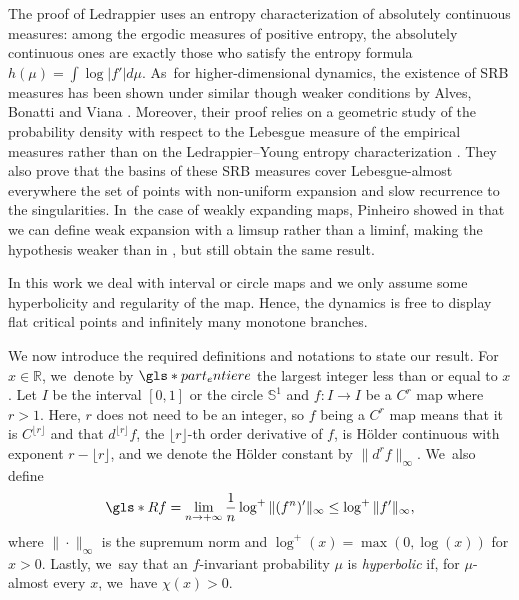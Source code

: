 \documentclass[JEP,XML,SOM,Unicode,NoFloatCountersInSection,published]{cedram}
\let\rC C
\theoremstyle{definition}
\newcommand{\bbR}{{\mathbb{R}}}
\newcommand{\bbS}{{\mathbb{S}}}
\begin{document}
The proof of Ledrappier uses an entropy characterization of absolutely continuous measures: among the ergodic measures of positive entropy, the absolutely continuous ones are exactly those who satisfy the entropy formula $h(\mu) = \int \log |f'| d \mu$. As~for higher-dimensional dynamics, the existence of SRB measures has been shown under similar though weaker conditions by Alves, Bonatti and Viana \cite{Alves2000}.
Moreover, their proof relies on a geometric study of the probability density with respect to the Lebesgue measure of the empirical measures rather than on the Ledrappier--Young entropy characterization \cite{Ledrappier_Young_1985a,Ledrappier_Young_1985b}.
They also prove that the basins of these SRB measures cover Lebesgue-almost everywhere the set of points with non-uniform expansion and slow recurrence to the singularities. In~the case of weakly expanding maps, Pinheiro showed in \cite{Pinheiro_2006,Pinheiro2011} that we can define weak expansion with a limsup rather than a liminf, making the hypothesis weaker than in \cite{Alves2000}, but still obtain the same result.

In this work we deal with interval or circle maps and we only assume some hyperbolicity and regularity of the map.
Hence, the dynamics is free to display flat critical points and infinitely many monotone branches.

We now introduce the required definitions and notations to state our result.
For $x \in \bbR$, we~denote by $\gls*{part_entiere}$ the largest integer less than or equal to $x$.
Let $I$ be the interval $[0, 1]$ or the circle $\bbS^1$ and $f : I \to I$ be a $\rC^r$ map where $r > 1$. Here, $r$ does not need to be an integer, so $f$ being a $\rC^r$ map means that it is $\rC^{\lfloor r \rfloor}$ and that $d^{\lfloor r \rfloor} f$, the $\lfloor r \rfloor$-th order derivative of $f$, is Hölder continuous with exponent $r - \lfloor r \rfloor$, and we denote the Hölder constant by $\| d^r f \|_{\infty}$. We~also define
\[
\gls*{Rf} = \lim_{n \to +\infty} \frac{1}{n} \log^+ \|(f^n)'\|_{\infty} \leq \log^+ \| f' \|_{\infty},
\]
where $\| \cdot \|_{\infty}$ is the supremum norm and $\log^+(x) =\max(0, \log(x))$ for $x > 0$.
Lastly, we~say that an $f$\nobreakdash-invariant probability $\mu$ is \textit{hyperbolic} if, for $\mu$-almost every $x$, we~have $\chi(x) > 0$.
\end{document}
